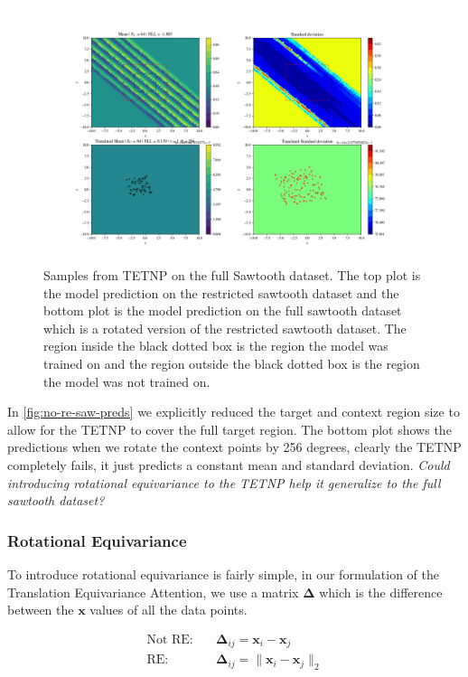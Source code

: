 \documentclass[../../main.tex]{subfiles}
\begin{document}
\begin{figure}[H]
    \centering
    \includegraphics[width=0.8\linewidth]{./fig/res-saw/no-re.png}
    \caption{Samples from TETNP on the full Sawtooth dataset. The top plot is the model prediction on the restricted sawtooth dataset and the bottom plot is the model prediction on the full sawtooth dataset which is a rotated version of the restricted sawtooth dataset.
    The region inside the black dotted box is the region the model was trained on and the region outside the black dotted box is the region the model was not trained on.}
    \label{fig:no-re-saw-preds}
\end{figure}

In \autoref{fig:no-re-saw-preds} we explicitly reduced the target and context region size to allow for the TETNP to cover the full target region. The bottom plot shows the predictions when we rotate the context points by 256 degrees, clearly the TETNP completely fails, it just predicts a constant mean and standard deviation. \emph{Could introducing rotational equivariance to the TETNP help it generalize to the full sawtooth dataset?}

\subsubsection{Rotational Equivariance}

To introduce rotational equivariance is fairly simple, in our formulation of the Translation Equivariance Attention, we use a matrix $\bm{\Delta}$ which is the difference between the $\bm{x}$ values of all the data points.

\begin{align}
    \text{Not RE}: \quad &\bm{\Delta}_{ij} = \bm{x}_i - \bm{x}_j\\
    \text{RE}: \quad &\bm{\Delta}_{ij} = \|\bm{x}_i - \bm{x}_j\|_2
\end{align}
\end{document}
